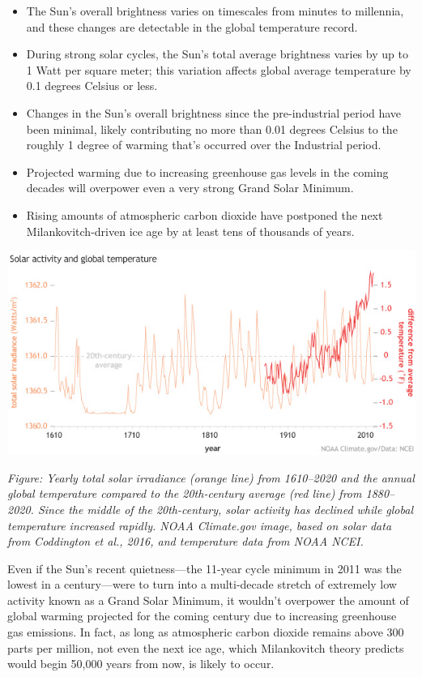 \documentclass[
]{book}
\providecommand{\tightlist}{%
  \setlength{\itemsep}{0pt}\setlength{\parskip}{0pt}}
\begin{document}
\begin{itemize}
\tightlist
\item
  The Sun's overall brightness varies on timescales from minutes to millennia, and these changes are detectable in the global temperature record.
\item
  During strong solar cycles, the Sun's total average brightness varies by up to 1 Watt per square meter; this variation affects global average temperature by 0.1 degrees Celsius or less.
\item
  Changes in the Sun's overall brightness since the pre-industrial period have been minimal, likely contributing no more than 0.01 degrees Celsius to the roughly 1 degree of warming that's occurred over the Industrial period.
\item
  Projected warming due to increasing greenhouse gas levels in the coming decades will overpower even a very strong Grand Solar Minimum.
\item
  Rising amounts of atmospheric carbon dioxide have postponed the next Milankovitch-driven ice age by at least tens of thousands of years.
\end{itemize}

\includegraphics{fig/TSI_vs_globaltemp.jpg}

\emph{Figure: Yearly total solar irradiance (orange line) from 1610--2020 and the annual global temperature compared to the 20th-century average (red line) from 1880--2020. Since the middle of the 20th-century, solar activity has declined while global temperature increased rapidly. NOAA Climate.gov image, based on solar data from Coddington et al., 2016, and temperature data from NOAA NCEI.}

Even if the Sun's recent quietness---the 11-year cycle minimum in 2011 was the lowest in a century---were to turn into a multi-decade stretch of extremely low activity known as a Grand Solar Minimum, it wouldn't overpower the amount of global warming projected for the coming century due to increasing greenhouse gas emissions. In fact, as long as atmospheric carbon dioxide remains above 300 parts per million, not even the next ice age, which Milankovitch theory predicts would begin 50,000 years from now, is likely to occur.
\end{document}
